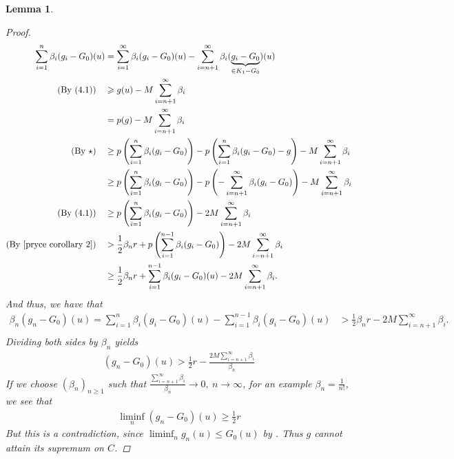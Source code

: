 \documentclass[10pt,twoside,openany,final]{memoir}
\theoremstyle{break}
\newtheorem{lemma}[section]{Lemma}
\theoremstyle{Break}
\begin{document}
\begin{lemma}
\begin{proof}
\begin{align*}
\sum_{i=1}^n \beta_{i}(g_{i}-G_{0})(u)
&= \sum_{i=1}^\infty \beta_{i}(g_{i}-G_{0})(u)-\sum_{i=n+1}^\infty \beta_{i}(\underbrace{g_{i}-G_{0}}_{\in K_{1}-G_{0}})(u) \\
(\text{By } (4.1))\quad &\geqslant g(u)-M \sum_{i=n+1}^\infty \beta_{i} \\
&=p(g)-M \sum_{i=n+1}^\infty \beta_{i}\\
(\text{By } \star)\quad &\geq p\left(  \sum_{i=1}^n \beta_{i}(g_{i}-G_{0})\right)-p\left( \sum_{i=1}^n \beta_{i}(g_{i}-G_{0})-g \right) - M \sum_{i=n+1}^\infty \beta_{i} \\
&\geq p\left(  \sum_{i=1}^n \beta_{i}(g_{i}-G_{0})\right)-p\left(- \sum_{i=n+1}^\infty \beta_{i}(g_{i}-G_{0}) \right) - M \sum_{i=n+1}^\infty \beta_{i} \\
(\text{By } (4.1))\quad &\geq p\left( \sum_{i=1}^n \beta_{i}(g_{i}-G_{0}) \right) -2M \sum_{i=n+1}^\infty \beta_{i}\\
(\text{By \Cref{pryce corollary 2}})\quad &> \frac{1}{2} \beta_{n} r + p\left( \sum_{i=1}^{n-1} \beta_{i}(g_{i}-G_{0}) \right)-2M \sum_{i=n+1}^\infty \beta_{i}\\
&\geq \frac{1}{2} \beta_{n} r + \sum_{i=1}^{n-1} \beta_{i}(g_{i}-G_{0})(u)-2M \sum_{i=n+1}^\infty \beta_{i}.
\end{align*}
And thus, we have that
\begin{align*}
\beta_{n} (g_{n}-G_{0})(u)=\sum_{i=1}^n \beta_{i}(g_{i}-G_{0})(u)-\sum_{i=1}^{n-1} \beta_{i}(g_{i}-G_{0})(u)&> \frac{1}{2} \beta_{n} r -2M \sum_{i=n+1}^\infty \beta_{i}.\\
\end{align*}
Dividing both sides by $\beta_{n}$ yields
\begin{align*}
(g_{n}-G_{0})(u) > \frac{1}{2}r - \frac{2M \sum_{i=n+1}^\infty \beta _{i}}{\beta _{n}}
\end{align*}
If we choose $(\beta_{n})_{n\geq 1}$ such that $\frac{\sum_{i=n+1}^\infty \beta _{i}}{\beta _{n}}\to 0, \ n \to \infty$, for an example $\beta_{n}=\frac{1}{n!}$, we see that
\begin{align*}
\liminf_{n} (g_{n}-G_{0})(u) \geq \frac12 r
\end{align*}
But this is a contradiction, since $\liminf_{n} g_{n}(u) \leq G_{0}(u)$ by . Thus $g$ cannot attain its supremum on $C$.
\end{proof}
\end{lemma}
\end{document}
